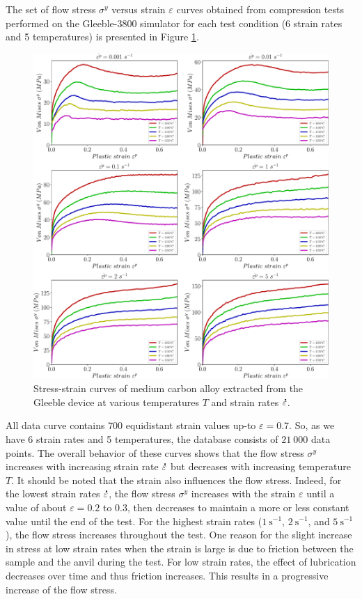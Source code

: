 \documentclass[twoside,english,1p,final,sort&compress]{elsarticle}
\theoremstyle{plain}
\DeclareRobustCommand{\mdot}[1]{\accentset{\mbox{\bfseries .}}{#1}}
\DeclareRobustCommand{\ps}{\text{s}^{-1}}
\begin{document}
The set of flow stress $\sigma^y$ versus strain $\varepsilon$ curves obtained from compression tests performed on the Gleeble-3800 simulator for each test condition (6 strain rates and 5 temperatures) is presented in Figure \ref{fig:RawData}.
\begin{figure}[!ht]
\centering
\includegraphics[width=\columnwidth]{Figures/rawData}
\caption{Stress-strain curves of medium carbon alloy extracted from the Gleeble device at various temperatures $T$ and strain rates $\mdot\varepsilon$.}
\label{fig:RawData}
\end{figure}
All data curve contains $700$ equidistant strain values up-to $\varepsilon=0.7$.
So, as we have 6 strain rates and 5 temperatures, the database consists of $21~000$ data points.
The overall behavior of these curves shows that the flow stress $\sigma^y$ increases with increasing strain rate $\mdot\varepsilon$ but decreases with increasing temperature $T$.
It should be noted that the strain also influences the flow stress.
Indeed, for the lowest strain rates $\mdot\varepsilon$, the flow stress $\sigma^y$ increases with the strain $\varepsilon$ until a value of about $\varepsilon=0.2$ to $0.3$, then decreases to maintain a more or less constant value until the end of the test.
For the highest strain rates ($1~\ps$, $2~\ps$, and $5~\ps$), the flow stress increases throughout the test.
One reason for the slight increase in stress at low strain rates when the strain is large is due to friction between the sample and the anvil during the test.
For low strain rates, the effect of lubrication decreases over time and thus friction increases.
This results in a progressive increase of the flow stress.
\end{document}
